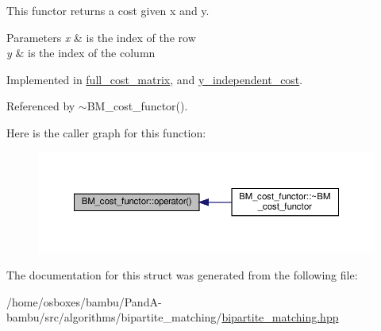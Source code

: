This functor returns a cost given x and y. 


\begin{DoxyParams}{Parameters}
{\em x} & is the index of the row \\
\hline
{\em y} & is the index of the column \\
\hline
\end{DoxyParams}


Implemented in \hyperlink{structfull__cost__matrix_a625adeda249e638a0ea9c702bb34c437}{full\+\_\+cost\+\_\+matrix}, and \hyperlink{structy__independent__cost_a887fe6ac33c423e279ef34c2205ac5ad}{y\+\_\+independent\+\_\+cost}.



Referenced by $\sim$\+B\+M\+\_\+cost\+\_\+functor().

Here is the caller graph for this function\+:
\nopagebreak
\begin{figure}[H]
\begin{center}
\leavevmode
\includegraphics[width=350pt]{de/d28/structBM__cost__functor_aa138a13f4daa2aee5b9e5b6315411bb1_icgraph}
\end{center}
\end{figure}


The documentation for this struct was generated from the following file\+:\begin{DoxyCompactItemize}
\item 
/home/osboxes/bambu/\+Pand\+A-\/bambu/src/algorithms/bipartite\+\_\+matching/\hyperlink{bipartite__matching_8hpp}{bipartite\+\_\+matching.\+hpp}\end{DoxyCompactItemize}
